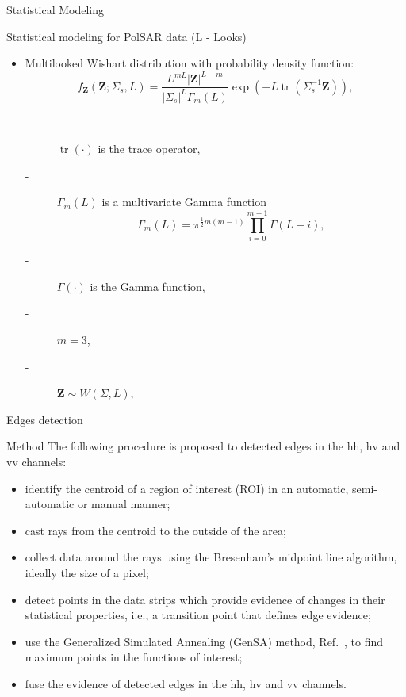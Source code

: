\documentclass[10pt]{beamer}
\DeclareMathOperator{\traco}{tr} %
\begin{document}
\begin{frame}[fragile]{Statistical Modeling}
\begin{alertblock}{Statistical modeling for PolSAR data (L - Looks)}
\begin{itemize}
\item Multilooked Wishart distribution with probability density function:
\begin{equation}
    f_{\mathbf{Z}}(\mathbf{Z};\Sigma_{s},L)=\frac{L^{mL}|\mathbf{Z}|^{L-m}}{|\Sigma_{s}|^{L}\Gamma_m(L)} \exp(-L\traco(\Sigma_{s}^{-1}\mathbf{Z})),
    \label{eq_04}
\end{equation} 
\begin{description}
\item[-] $\traco(\cdot)$ is the trace operator,
\item[-] $\Gamma_m(L)$ is a multivariate Gamma function
\begin{equation*}
	\Gamma_m(L)=\pi^{\frac{1}{2}m(m-1)} \prod_{i=0}^{m-1}\Gamma(L-i),
\end{equation*}
\item[-]$\Gamma(\cdot)$ is the Gamma function,
\item[-]$m=3$,
\item[-]$\mathbf{Z}\sim W(\Sigma, L)$, 
\end{description} 
\end{itemize}
\end{alertblock}
\end{frame}

\begin{frame}[fragile]{Edges detection}
\begin{alertblock}{Method}
The following procedure is proposed to detected edges in the $\text{hh}$, $\text{hv}$ and $\text{vv}$ channels:
\begin{itemize}
	\item identify the centroid of a region of interest (ROI) in an automatic, semi-automatic or manual manner;
	\item cast rays from the centroid to the outside of the area;
	\item collect data around the rays using the  Bresenham's midpoint line algorithm, ideally the size of a pixel;
	\item detect points in the data strips which provide evidence of changes in their statistical properties, i.e., a transition point that defines edge evidence;
	\item use the Generalized Simulated Annealing (GenSA) method, Ref.~\cite{xgsh}, to find maximum points in the functions of interest;
	\item fuse the evidence of detected edges in the $\text{hh}$, $\text{hv}$ and $\text{vv}$ channels.
\end{itemize}
\end{alertblock}
\end{frame}
\end{document}
